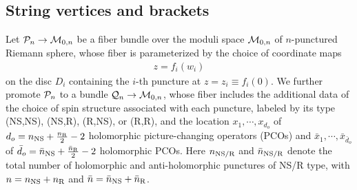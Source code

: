 \documentclass[12pt]{article}
\def\ie{\begin{equation}\begin{aligned}}
\def\fe{\end{aligned}\end{equation}}
\numberwithin{equation}{section}
\begin{document}

\subsection{String vertices and brackets}
\label{sec:stringfieldbracket}


Let ${\cal P}_{n}\to {\cal M}_{0,n}$ be a fiber bundle over the moduli space ${\cal M}_{0,n}$ of $n$-punctured Riemann sphere, whose fiber is parameterized by the choice of coordinate maps
\ie\label{zwimap}
z = f_i(w_i)
\fe
on the disc $D_i$ containing the $i$-th puncture at $z=z_i\equiv f_i(0)$. We further promote ${\cal P}_{n}$ to a bundle ${\cal Q}_{n}\to {\cal M}_{0,n}$, whose fiber includes the additional data of the choice of spin structure associated with each puncture, labeled by its type (NS,NS), (NS,R), (R,NS), or (R,R), and the location $x_1,\cdots, x_{d_o}$ of $d_o= n_{\rm NS} + {n_{\rm R}\over 2} - 2$
holomorphic picture-changing operators (PCOs) and $\bar x_1,\cdots,\bar x_{\bar d_o}$ of $\bar d_o= \bar n_{\rm NS} + {\bar n_{\rm R}\over 2}-2$ holomorphic PCOs. Here $n_{\rm NS/R}$ and $\bar n_{\rm NS/R}$ denote the total number of holomorphic and anti-holomorphic punctures of NS/R type, with $n=n_{\rm NS} + n_{\rm R}$ and $\bar n=\bar n_{\rm NS} + \bar n_{\rm R}$.
\end{document}
